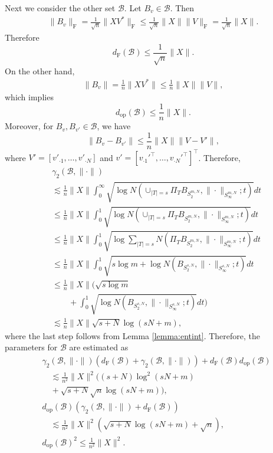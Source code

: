 \documentclass[11pt,journal]{IEEEtran}
\newcommand{\norm}[1]{\|{#1}\|}
\newcommand{\T}{\top}
\begin{document}
\begin{IEEEproof}
Next we consider the other set $\mathcal{B}$. Let $B_v \in \mathcal{B}$. Then
\begin{align*}
\norm{B_{v}}_{\mathrm{F}}
= \frac{1}{\sqrt{n}}\norm{X V^*}_{\mathrm{F}}
\leq \frac{1}{\sqrt{n}} \norm{X} \norm{V}_{\mathrm{F}}
= \frac{1}{\sqrt{n}} \norm{X}.
\end{align*}
Therefore
\[
d_{\mathrm{F}}(\mathcal{B}) \leq \frac{1}{\sqrt{n}} \norm{X}. 
\]
On the other hand,
\begin{align*}
\norm{B_{v}} = \frac{1}{n} \norm{X V^*} \leq \frac{1}{n} \norm{X} \norm{V},
\end{align*}
which implies
\[
d_{\mathrm{op}}(\mathcal{B}) \leq \frac{1}{n} \norm{X}. 
\]
Moreover, for $B_v, B_{v'} \in \mathcal{B}$, we have
\[
\norm{B_{v} - B_{v'}}
\leq \frac{1}{n} \norm{X} \norm{V - V'},
\]
where $V' = [v'_{\cdot 1},\dots,v'_{\cdot N}]$ and $v' = [v_{\cdot 1}'^\T,\dots,v_{\cdot N}'^\T]^\T$.
Therefore, 
\begin{align*}
& \gamma_2(\mathcal{B},\norm{\cdot}) \\
& \lesssim \frac{1}{n} \norm{X} \int_0^\infty \sqrt{\log N(\cup_{|T| = s} \Pi_T B_{S_2^{m,N}},\norm{\cdot}_{S_\infty^{m,N}};t)} dt \\
& \leq \frac{1}{n} \norm{X} \int_0^1 \sqrt{\log N(\cup_{|T| = s} \Pi_T B_{S_2^{m,N}},\norm{\cdot}_{S_\infty^{m,N}};t)} dt \\
& \leq \frac{1}{n} \norm{X} \int_0^1 \sqrt{\log \sum_{|T|=s} N(\Pi_T B_{S_2^{m,N}},\norm{\cdot}_{S_\infty^{m,N}};t)} dt \\
& \leq \frac{1}{n} \norm{X} \int_0^1 \sqrt{s \log m + \log N(B_{S_2^{s,N}},\norm{\cdot}_{S_\infty^{s,N}};t)} dt \\
& \leq \frac{1}{n} \norm{X} \Big( \sqrt{s \log m} \\
& \qquad + \int_0^1 \sqrt{\log N(B_{S_2^{s,N}},\norm{\cdot}_{S_\infty^{s,N}};t)} dt
\Big) \\
& \lesssim \frac{1}{n} \norm{X} \sqrt{s+N} \log(sN+m),
\end{align*}
where the last step follows from Lemma \ref{lemma:entint}.
Therefore, the parameters for $\mathcal{B}$ are estimated as
\begin{align*}
& \gamma_2(\mathcal{B},\norm{\cdot}) (d_{\mathrm{F}}(\mathcal{B})+\gamma_2(\mathcal{B},\norm{\cdot})) + d_{\mathrm{F}}(\mathcal{B}) d_{\mathrm{op}}(\mathcal{B}) \\
& \quad \lesssim \frac{1}{n^2} \norm{X}^2 ((s+N) \log^2(sN+m) \\
& \quad + \sqrt{s+N} \sqrt{n} \log(sN+m)), \\
& d_{\mathrm{op}}(\mathcal{B})(\gamma_2(\mathcal{B},\norm{\cdot}) + d_{\mathrm{F}}(\mathcal{B})) \\
& \quad \lesssim \frac{1}{n^2} \norm{X}^2 (\sqrt{s+N} \log(sN+m) + \sqrt{n}), \\
& d_{\mathrm{op}}(\mathcal{B})^2 \leq \frac{1}{n^2} \norm{X}^2.
\end{align*}


\end{IEEEproof}
\end{document}

